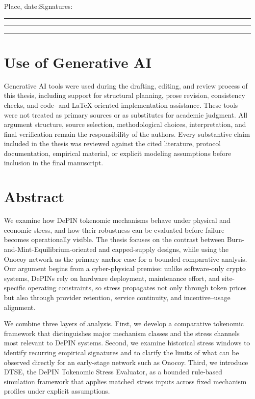 \documentclass[12pt,a4paper]{article}
\begin{document}
\vfill

\noindent Place, date:\hfill Signatures:

\vspace{1.8cm}

\noindent\rule{0.28\textwidth}{0.4pt}\hfill\rule{0.28\textwidth}{0.4pt}\hfill\rule{0.28\textwidth}{0.4pt}
\clearpage


\section*{Use of Generative AI}
{}
Generative AI tools were used during the drafting, editing, and review process of this thesis, including support for structural planning, prose revision, consistency checks, and code- and LaTeX-oriented implementation assistance. These tools were not treated as primary sources or as substitutes for academic judgment. All argument structure, source selection, methodological choices, interpretation, and final verification remain the responsibility of the authors. Every substantive claim included in the thesis was reviewed against the cited literature, protocol documentation, empirical material, or explicit modeling assumptions before inclusion in the final manuscript.
\clearpage

\section*{Abstract}
{}
We examine how DePIN tokenomic mechanisms behave under physical and economic stress, and how their robustness can be evaluated before failure becomes operationally visible. The thesis focuses on the contrast between Burn-and-Mint-Equilibrium-oriented and capped-supply designs, while using the Onocoy network as the primary anchor case for a bounded comparative analysis. Our argument begins from a cyber-physical premise: unlike software-only crypto systems, DePINs rely on hardware deployment, maintenance effort, and site-specific operating constraints, so stress propagates not only through token prices but also through provider retention, service continuity, and incentive--usage alignment.

We combine three layers of analysis. First, we develop a comparative tokenomic framework that distinguishes major mechanism classes and the stress channels most relevant to DePIN systems. Second, we examine historical stress windows to identify recurring empirical signatures and to clarify the limits of what can be observed directly for an early-stage network such as Onocoy. Third, we introduce DTSE, the DePIN Tokenomic Stress Evaluator, as a bounded rule-based simulation framework that applies matched stress inputs across fixed mechanism profiles under explicit assumptions.
\end{document}
